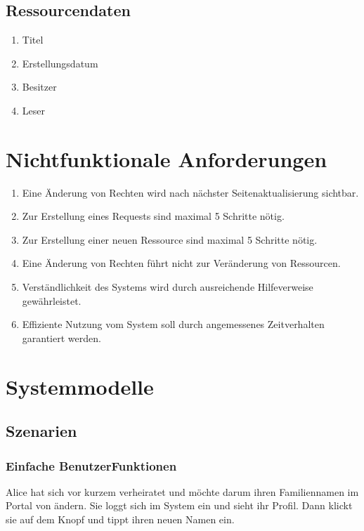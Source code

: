 \documentclass[parskip=full,11pt]{scrartcl}
\def\threedigits#1{%
  \ifnum#1<10 0\fi
  \ifnum#1<1 0\fi
  \number#1}
\begin{document}
\subsection{Ressourcendaten}
\begin{enumerate}[label={\textbf{/D\protect\threedigits{\theenumi}0/}}, leftmargin=*, resume]
		\item Titel
		\item Erstellungsdatum
		\item Besitzer
        	\item Leser     
\end{enumerate}

\newpage
\section{Nichtfunktionale Anforderungen}
\begin{enumerate}[label={\textbf{/NF\protect\threedigits{\theenumi}0/}}, leftmargin=*]
\item Eine Änderung von Rechten wird nach nächster Seitenaktualisierung sichtbar.
\item Zur Erstellung eines Requests sind maximal 5 Schritte nötig.
\item Zur Erstellung einer neuen Ressource sind maximal 5 Schritte nötig.
\item Eine Änderung von Rechten führt nicht zur Veränderung von Ressourcen.
\item Verständlichkeit des Systems wird durch ausreichende Hilfeverweise gewährleistet.
\item Effiziente Nutzung vom System soll durch angemessenes Zeitverhalten garantiert werden.  
\end{enumerate}

\newpage
\section{Systemmodelle}

\subsection{Szenarien}
\subsubsection*{Einfache BenutzerFunktionen}
Alice hat sich vor kurzem verheiratet und möchte darum ihren Familiennamen im Portal von \grqq ändern. Sie loggt sich im System ein und sieht ihr Profil. Dann klickt sie auf dem Knopf \grqq und tippt ihren neuen Namen ein. 
\end{document}
